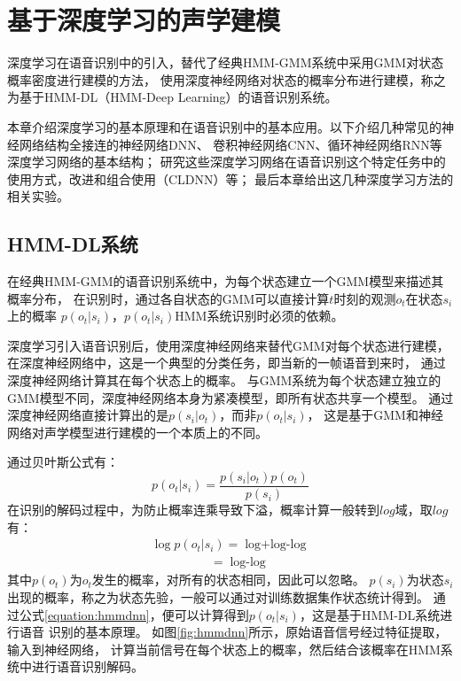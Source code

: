 ﻿%

\chapter{基于深度学习的声学建模}\label{intro_dl}


深度学习在语音识别中的引入，替代了经典HMM-GMM系统中采用GMM对状态概率密度进行建模的方法，
使用深度神经网络对状态的概率分布进行建模，称之为基于HMM-DL（HMM-Deep Learning）的语音识别系统。

本章介绍深度学习的基本原理和在语音识别中的基本应用。以下介绍几种常见的神经网络结构全接连的神经网络DNN、
卷积神经网络CNN、循环神经网络RNN等深度学习网络的基本结构；
研究这些深度学习网络在语音识别这个特定任务中的使用方式，改进和组合使用（CLDNN）等；
最后本章给出这几种深度学习方法的相关实验。

\section{HMM-DL系统}\label{section:hmmdl}

在经典HMM-GMM的语音识别系统中，为每个状态建立一个GMM模型来描述其概率分布，
在识别时，通过各自状态的GMM可以直接计算$t$时刻的观测$o_t$在状态$s_i$上的概率
$p(o_t|s_i)$，$p(o_t|s_i)$HMM系统识别时必须的依赖。

深度学习引入语音识别后，使用深度神经网络来替代GMM对每个状态进行建模，
在深度神经网络中，这是一个典型的分类任务，即当新的一帧语音到来时，
通过深度神经网络计算其在每个状态上的概率。
与GMM系统为每个状态建立独立的GMM模型不同，深度神经网络本身为紧凑模型，即所有状态共享一个模型。
通过深度神经网络直接计算出的是$p(s_i|o_t)$，而非$p(o_t|s_i)$，
这是基于GMM和神经网络对声学模型进行建模的一个本质上的不同。

通过贝叶斯公式有：
\begin{equation}
p(o_t|s_i) = \frac{p(s_i|o_t)p(o_t)}{p(s_i)}
\end{equation}
在识别的解码过程中，为防止概率连乘导致下溢，概率计算一般转到$log$域，取$log$有：
\begin{equation} \label{equation:hmmdnn}
\begin{array}{l}
\log{p(o_t|s_i)} = \mathop {\log{p(s_i|o_t)} + \log{p(o_t)} - \log{p(s_i)}} \\
\;\;\;\;\;\;\;\;\;\;\;\;\;\;\;\;\; = \mathop {\log{p(s_i|o_t)} - \log{p(s_i)}}
\end{array}
\end{equation}
其中$p(o_t)$为$o_t$发生的概率，对所有的状态相同，因此可以忽略。
$p(s_i)$为状态$s_i$出现的概率，称之为状态先验，一般可以通过对训练数据集作状态统计得到。
通过公式\ref{equation:hmmdnn}，便可以计算得到$p(o_t|s_i)$，这是基于HMM-DL系统进行语音
识别的基本原理。
如图\ref{fig:hmmdnn}所示，原始语音信号经过特征提取，输入到神经网络，
计算当前信号在每个状态上的概率，然后结合该概率在HMM系统中进行语音识别解码。


